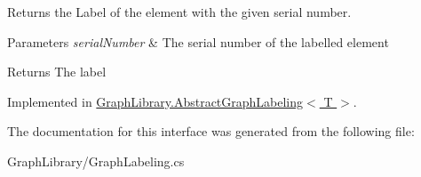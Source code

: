 Returns the Label of the element with the given serial number. 


\begin{DoxyParams}{Parameters}
{\em serial\+Number} & The serial number of the labelled element\\
\hline
\end{DoxyParams}
\begin{DoxyReturn}{Returns}
The label
\end{DoxyReturn}


Implemented in \hyperlink{class_graph_library_1_1_abstract_graph_labeling_a88b33d453be1ca7b7625c9cb253fdd3a}{Graph\+Library.\+Abstract\+Graph\+Labeling$<$ T $>$}.



The documentation for this interface was generated from the following file\+:\begin{DoxyCompactItemize}
\item 
Graph\+Library/Graph\+Labeling.\+cs\end{DoxyCompactItemize}
